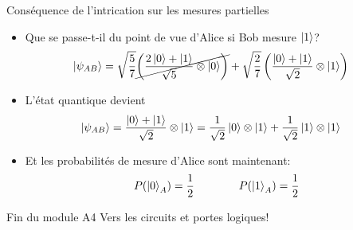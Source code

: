 \documentclass[aspectratio=169,12pt]{beamer}
\begin{document}
\begin{frame}{Conséquence de l'intrication sur les mesures partielles}
  \begin{itemize}[<+->]
    \item Que se passe-t-il du point de vue d'Alice si Bob mesure $\ket{1}$?
    \begin{align*}
      \ket{\psi_{AB}} 
      &= \sqrt{\frac{5}{7}} \cancel{\left( \frac{2\ket{0}+\ket{1}}{\sqrt{5}} \otimes \ket{0} \right)} + \sqrt{\frac{2}{7}} \left( \frac{\ket{0}+\ket{1}}{\sqrt{2}} \otimes \ket{1} \right)
    \end{align*}
    \item L'état quantique devient
    \begin{align*}
      \ket{\psi_{AB}} 
      &= \frac{\ket{0}+\ket{1}}{\sqrt{2}} \otimes \ket{1} = \frac{1}{\sqrt{2}} \ket{0} \otimes \ket{1} + \frac{1}{\sqrt{2}} \ket{1} \otimes \ket{1}
    \end{align*}
    \item Et les probabilités de mesure d'Alice sont maintenant:
    \begin{equation*}
      P(\ket{0}_A) = \frac{1}{2} \qquad\qquad P(\ket{1}_A) = \frac{1}{2}
    \end{equation*}
  \end{itemize}
\end{frame}

\begin{frame}{Fin du module A4}
    \centering
  \vfill
  Vers les circuits et portes logiques!
  \vfill
\end{frame}




\end{document}
